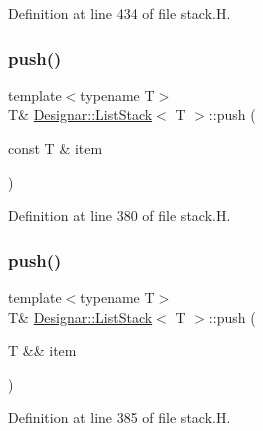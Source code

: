 Definition at line 434 of file stack.\+H.

\mbox{\label{class_designar_1_1_list_stack_a02d19090b599fd54ebb5e693d0a8d2d0}} 
\subsubsection{\texorpdfstring{push()}{push()}\hspace{0.1cm}{\footnotesize\ttfamily [1/2]}}
{\footnotesize\ttfamily template$<$typename T$>$ \\
T\& \hyperlink{class_designar_1_1_list_stack}{Designar\+::\+List\+Stack}$<$ T $>$\+::push (\begin{DoxyParamCaption}\item[{const T \&}]{item }\end{DoxyParamCaption})\hspace{0.3cm}{\ttfamily [inline]}}



Definition at line 380 of file stack.\+H.

\mbox{\label{class_designar_1_1_list_stack_a96bb73a3658f95565769e8b50c903f88}} 
\subsubsection{\texorpdfstring{push()}{push()}\hspace{0.1cm}{\footnotesize\ttfamily [2/2]}}
{\footnotesize\ttfamily template$<$typename T$>$ \\
T\& \hyperlink{class_designar_1_1_list_stack}{Designar\+::\+List\+Stack}$<$ T $>$\+::push (\begin{DoxyParamCaption}\item[{T \&\&}]{item }\end{DoxyParamCaption})\hspace{0.3cm}{\ttfamily [inline]}}



Definition at line 385 of file stack.\+H.

\mbox{\label{class_designar_1_1_list_stack_abec63f99f62a9b7d92e1a051767017dc}} 

